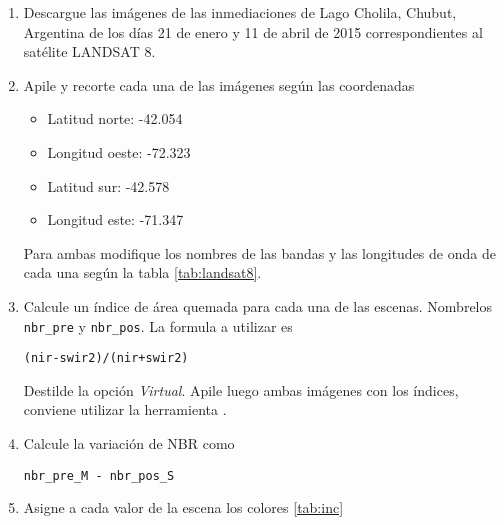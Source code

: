 \begin{enumerate}
\item Descargue las imágenes de las inmediaciones de Lago Cholila, Chubut, Argentina de los días 21 de enero y 11 de abril de 2015 correspondientes al satélite LANDSAT 8.

\item Apile y recorte cada una de las imágenes según las coordenadas

\begin{itemize}
    \item Latitud norte: -42.054
    \item Longitud oeste: -72.323
    \item Latitud sur: -42.578
    \item Longitud este: -71.347
\end{itemize}

Para ambas modifique los nombres de las bandas y las longitudes de onda de cada una según la tabla \ref{tab:landsat8}.

\item Calcule un índice de área quemada para cada una de las escenas. Nombrelos \texttt{nbr\_pre} y \texttt{nbr\_pos}. La formula a utilizar es

\begin{verbatim}
(nir-swir2)/(nir+swir2)
\end{verbatim}

Destilde la opción \emph{Virtual}. Apile luego ambas imágenes con los índices, conviene utilizar la herramienta .

\item Calcule la variación de NBR como

\begin{verbatim}
nbr_pre_M - nbr_pos_S
\end{verbatim}

\item Asigne a cada valor de la escena los colores \ref{tab:inc}


\end{enumerate}
